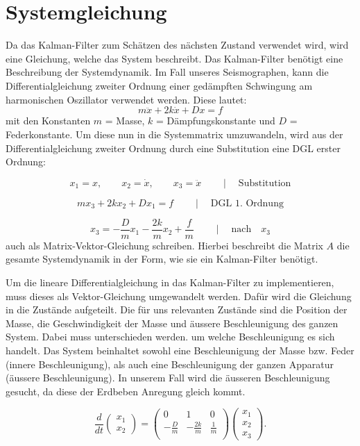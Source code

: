 \documentclass[11pt,a4paper]{article}
\begin{document}
\section{Systemgleichung}
Da das Kalman-Filter zum Schätzen des nächsten Zustand verwendet wird, wird eine Gleichung, welche das System beschreibt. Das Kalman-Filter benötigt eine Beschreibung der Systemdynamik. Im Fall unseres Seismographen, kann die Differentialgleichung zweiter Ordnung einer gedämpften Schwingung am harmonischen Oszillator verwendet werden. Diese lautet:
\begin{equation}
m\ddot x + 2k \dot x + Dx = f
\end{equation}
mit den Konstanten $m$ = Masse, $k$ = Dämpfungskonstante und $D$  = Federkonstante.
Um diese nun in die Systemmatrix umzuwandeln, wird aus der Differentialgleichung zweiter Ordnung durch eine Substitution eine DGL erster Ordnung:


\begin{equation}
{x_1}=x, \qquad
{x_2}=\dot x,  \qquad
{x_3}=\ddot x\qquad \mid \quad \text {Substitution}
\end{equation}


\begin{equation}
m{x_3}+ 2k{x_2} + D{x_1} = f\qquad \mid \quad \text {DGL 1. Ordnung}
\end{equation} 

\begin{equation}
{x_3}=-\frac{D}{m} {x_1} -\frac{2k}{m} {x_2} + \frac{f} {m}  \qquad \mid \quad \text {nach}  \quad{x_3} 
\end{equation} 
auch als Matrix-Vektor-Gleichung schreiben.
Hierbei beschreibt die Matrix $A$ die gesamte Systemdynamik in der Form, wie sie ein Kalman-Filter benötigt.

Um die lineare Differentialgleichung in das Kalman-Filter zu implementieren, muss dieses als Vektor-Gleichung umgewandelt werden. Dafür wird die Gleichung in die Zustände aufgeteilt. Die für uns relevanten Zustände sind die Position der Masse, die Geschwindigkeit der Masse und äussere Beschleunigung des ganzen System. Dabei muss unterschieden werden. um welche Beschleunigung es sich handelt. Das System beinhaltet sowohl eine Beschleunigung der Masse bzw. Feder (innere Beschleunigung), als auch eine Beschleunigung der ganzen Apparatur (äussere Beschleunigung). In unserem Fall wird die äusseren Beschleunigung gesucht, da diese der Erdbeben Anregung gleich kommt. 


\begin{equation}
\frac{d}{dt} \left(\begin{array}{c} {x_1} \\ {x_2}  \end{array}\right) = \left(
 \begin{array}{ccc} 	
0 & 1& 0 \\ 
- \frac{D}{m} &-\frac{2k}{m} & \frac{1} {m}\\
\end{array}\right)  \left(\begin{array}{c} {x_1} \\ {x_2} \\ {x_3} \end{array}\right).
\end{equation}
\end{document}
